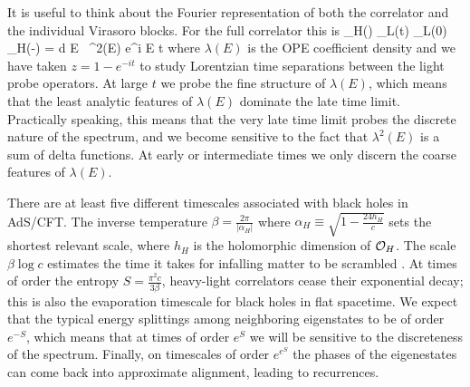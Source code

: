It is useful to think about the Fourier representation of both the correlator and the individual Virasoro blocks.  For the full correlator this is
\be
\< \CO_H(\infty) \CO_L(t) \CO_L(0) \CO_H(-\infty) \> = \int d E \,  \lambda^2(E) e^{i E t}
\ee
where $\lambda(E)$ is the OPE coefficient density and we have taken $z = 1 - e^{-it}$ to study Lorentzian time separations between the light probe operators.  At large $t$ we probe the fine structure of $\lambda(E)$, which means that the least analytic features of $\lambda(E)$ dominate the late time limit.  Practically speaking, this means that the very late time limit probes the discrete nature of the spectrum, and we become sensitive to the fact that $\lambda^2(E)$ is a sum of delta functions.  At early or intermediate times we only discern the coarse features of $\lambda(E)$.  

There are at least five different timescales associated with black holes in AdS/CFT.  The inverse temperature $\beta = \frac{2 \pi}{|\alpha_H|}$ where $\alpha_H \equiv \sqrt{1- \frac{24 h_H}{c}}$  sets the shortest relevant scale, where $h_H$ is the holomorphic dimension of ${\cal O}_H$.  The scale $\beta \log c$ estimates the time it takes for infalling matter to be scrambled \cite{Hayden:2007cs, Maldacena:2015waa}.  At times of order the entropy $S = \frac{\pi^2 c}{3 \beta}$, heavy-light correlators cease their exponential decay; this is also the evaporation timescale for black holes in flat spacetime.  We expect that the typical energy splittings among neighboring eigenstates to be of order $e^{-S}$, which means that at times of order $e^S$ we will be sensitive to the discreteness of the spectrum.  Finally, on timescales of order $e^{e^S}$ the phases of the eigenestates can come back into approximate alignment, leading to recurrences.   



